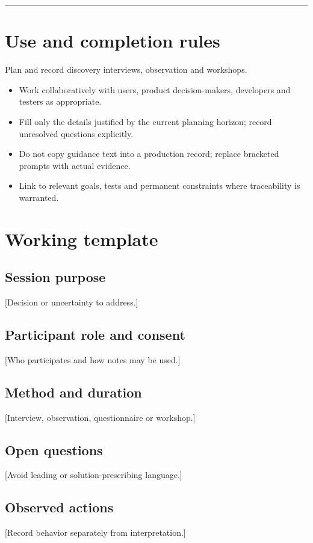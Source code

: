 \documentclass[11pt,letterpaper]{article}
\begin{document}
\tableofcontents\medskip\noindent\rule{\linewidth}{0.4pt}\medskip
\section{Use and completion rules}
Plan and record discovery interviews, observation and workshops.

\begin{itemize}[leftmargin=*,itemsep=2pt]
\item Work collaboratively with users, product decision-makers, developers and testers as appropriate.
\item Fill only the details justified by the current planning horizon; record unresolved questions explicitly.
\item Do not copy guidance text into a production record; replace bracketed prompts with actual evidence.
\item Link to relevant goals, tests and permanent constraints where traceability is warranted.
\end{itemize}
\section{Working template}
\subsection{Session purpose}
[Decision or uncertainty to address.]

\subsection{Participant role and consent}
[Who participates and how notes may be used.]

\subsection{Method and duration}
[Interview, observation, questionnaire or workshop.]

\subsection{Open questions}
[Avoid leading or solution-prescribing language.]

\subsection{Observed actions}
[Record behavior separately from interpretation.]
\end{document}
